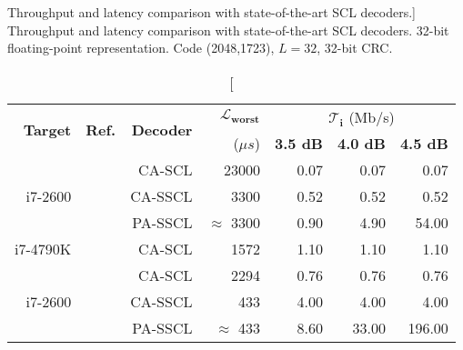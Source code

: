 \begin{table}[htp]
  \centering
  \caption
    [Throughput and latency comparison with state-of-the-art SCL decoders.]
    {Throughput and latency comparison with state-of-the-art SCL decoders.
    32-bit floating-point representation. Code (2048,1723), $L = 32$, 32-bit
    CRC.}
  \label{tab:eval_polar_scl_perfs_comparison}
  \begin{tabular}{r r r r r r r}
    \multirow{2}{*}{\textbf{Target}} & \multirow{2}{*}{\textbf{Ref.}}        & \multirow{2}{*}{\textbf{Decoder}} & \multirow{1}{*}{\textbf{$\bm{\mathcal{L}_{worst}}$}} & \multicolumn{3}{c}{$\bm{\mathcal{T}_i}$ (Mb/s)} \\
    \cline{5-7}
                                     &                                       &                                   & ($\mu s$)                         & \textbf{3.5 dB} & \textbf{4.0 dB} & \textbf{4.5 dB} \\
    \hline
    \hline
    \multirow{3}{*}{i7-2600}         & \multirow{3}{*}{\cite{Sarkis2014b}}   & CA-SCL                            & 23000                             &  0.07           &  0.07           &   0.07          \\
                                     &                                       & CA-SSCL                           &  3300                             &  0.52           &  0.52           &   0.52          \\
                                     &                                       & PA-SSCL                           & $\approx$ 3300                    &  0.90           &  4.90           &  54.00          \\
    \hline
    \multirow{1}{*}{i7-4790K}        & \cite{Shen2016}                       & CA-SCL                            &  1572                             &  1.10           &  1.10           &   1.10          \\
    \hline
    \multirow{3}{*}{i7-2600}         & \multirow{3}{*}{\cite{Sarkis2016}}    & CA-SCL                            &  2294                             &  0.76           &  0.76           &   0.76          \\
                                     &                                       & CA-SSCL                           &   433                             &  4.00           &  4.00           &   4.00          \\
                                     &                                       & PA-SSCL                           & $\approx$ 433                     &  8.60           & 33.00           & 196.00          \\

\end{tabular}
\end{table}
